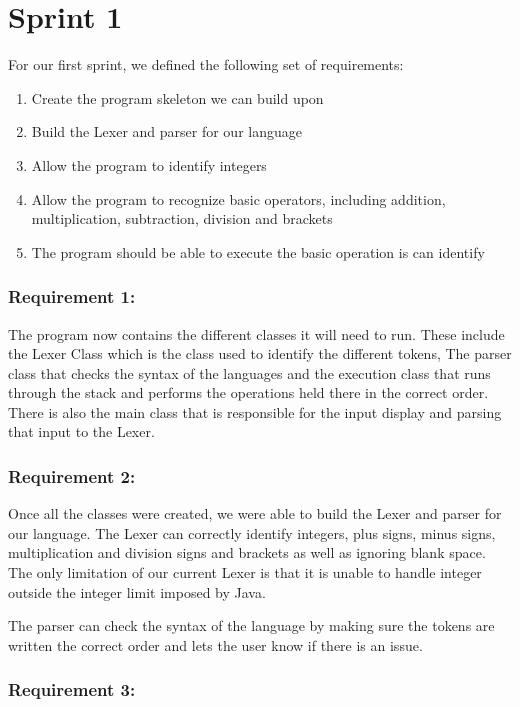 \documentclass[a4paper, oneside, 11pt]{report}
\begin{document}
\section{Sprint 1}

For our first sprint, we defined the following set of requirements: 

\begin{enumerate}
\item Create the program skeleton we can build upon 
\item Build the Lexer and parser for our language 
\item Allow the program to identify integers 
\item Allow the program to recognize basic operators, including addition, multiplication, subtraction, division and brackets 
\item The program should be able to execute the basic operation is can identify 
\end{enumerate}

\subsubsection{Requirement 1:}

The program now contains the different classes it will need to run. These include the Lexer Class which is the class used to identify the different tokens, The parser class that checks the syntax of the languages and the execution class that runs through the stack and performs the operations held there in the correct order. There is also the main class that is responsible for the input display and parsing that input to the Lexer. 

\subsubsection{Requirement 2:}

Once all the classes were created, we were able to build the Lexer and parser for our language. The Lexer can correctly identify integers, plus signs, minus signs, multiplication and division signs and brackets as well as ignoring blank space. The only limitation of our current Lexer is that it is unable to handle integer outside the integer limit imposed by Java. 

The parser can check the syntax of the language by making sure the tokens are written the correct order and lets the user know if there is an issue. 

\subsubsection{Requirement 3:}
\end{document}

